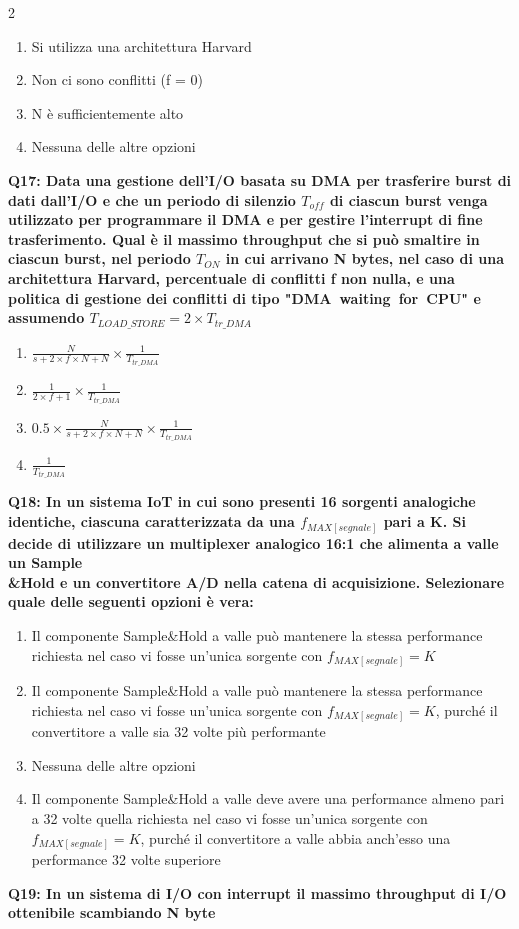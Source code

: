 \documentclass[10pt]{article}
\begin{document}
\begin{multicols}{2}
\begin{enumerate}[label=\arabic*.]
\item Si utilizza una architettura Harvard
\item Non ci sono conflitti (f = 0)
\item N è sufficientemente alto
\item Nessuna delle altre opzioni
\end{enumerate}
\textbf{Q17: Data una gestione dell’I/O basata su DMA per trasferire burst di dati dall’I/O e che un periodo di silenzio $T_{off}$ di ciascun burst venga utilizzato per programmare il DMA e per gestire l’interrupt di fine trasferimento. Qual è il massimo throughput che si può smaltire in ciascun burst, nel periodo $T_{ON}$ in cui arrivano N bytes, nel caso di una architettura Harvard, percentuale di conflitti f non nulla, e una politica di gestione dei conflitti di tipo "DMA waiting for CPU" e assumendo $T_{LOAD\_STORE} = 2 \times T_{tr\_DMA}$}

\begin{enumerate}[label=\arabic*.]
\item $\frac{N}{s+ 2 \times f \times N + N} \times \frac{1}{T_{tr\_DMA}} $
\item $\frac{1}{ 2 \times f + 1} \times \frac{1}{T_{tr\_DMA}} $
\item $0.5 \times \frac{N}{s+ 2 \times f \times N + N} \times \frac{1}{T_{tr\_DMA}} $
\item $\frac{1}{T_{tr\_DMA}}$
\end{enumerate}
\textbf{Q18: In un sistema IoT in cui sono presenti 16 sorgenti analogiche identiche, ciascuna caratterizzata da una $f_{MAX[segnale]}$ pari a K. Si decide di utilizzare un multiplexer analogico 16:1 che alimenta a valle un Sample\\\&Hold e un convertitore A/D nella catena di acquisizione. Selezionare quale delle seguenti opzioni è vera:}

\begin{enumerate}[label=\arabic*.]
\item Il componente Sample\&Hold a valle può mantenere la stessa performance richiesta nel caso vi fosse un'unica sorgente con $f_{MAX[segnale]} = K$
\item Il componente Sample\&Hold a valle può mantenere la stessa performance richiesta nel caso vi fosse un'unica sorgente con $f_{MAX[segnale]} = K$, purché il convertitore a valle sia 32 volte più performante
\item Nessuna delle altre opzioni
\item Il componente Sample\&Hold a valle deve avere una performance almeno pari a 32 volte quella richiesta nel caso vi fosse un'unica sorgente con $f_{MAX[segnale]} = K$, purché il convertitore a valle abbia anch’esso una performance 32 volte superiore
\end{enumerate}
\textbf{Q19: In un sistema di I/O con interrupt il massimo throughput di I/O ottenibile scambiando N byte}


\end{multicols}
\end{document}
